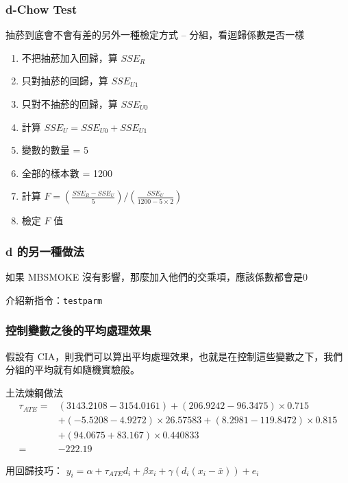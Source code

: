 \begin{frame}
    \frametitle{d-Chow Test}

    抽菸到底會不會有差的另外一種檢定方式 -- 分組，看迴歸係數是否一樣

    \begin{enumerate}
        \item 不把抽菸加入回歸，算 $SSE_{R} $
        \item 只對抽菸的回歸，算 $SSE_{U1}$
        \item 只對不抽菸的回歸，算 $SSE_{U0}$
        \item 計算 $SSE_U = SSE_{U0} + SSE_{U1}$
        \item 變數的數量 = 5
        \item 全部的樣本數 = 1200
        \item 計算 $F = \left(\frac{SSE_R - SSE_U}{5}\right)/\left(\frac{SSE_U}{1200 - 5\times 2}\right)$
        \item 檢定 $F$ 值
    \end{enumerate}
\end{frame}

\begin{frame}
    \frametitle{d 的另一種做法}
    如果 MBSMOKE 沒有影響，那麼加入他們的交乘項，應該係數都會是0

    介紹新指令：\texttt{testparm}

\end{frame}

\begin{frame}
    \frametitle{控制變數之後的平均處理效果}
    假設有 CIA，則我們可以算出平均處理效果，也就是在控制這些變數之下，我們分組的平均就有如隨機實驗般。
    
    土法煉鋼做法
    \begin{align*}
        \tau_{ATE} =& (3143.2108 - 3154.0161) + (206.9242 - 96.3475) \times 0.715 \\
        &+ (-5.5208 - 4.9272)\times 26.57583+(8.2981-119.8472)\times0.815 \\
        &+ (94.0675+83.167)\times 0.440833 \\
        =& -222.19
    \end{align*}
    
    用回歸技巧：
    $y_i = \alpha + \tau_{ATE} d_i + \beta x_i + \gamma(d_i (x_i - \bar{x})) + e_i$

\end{frame}